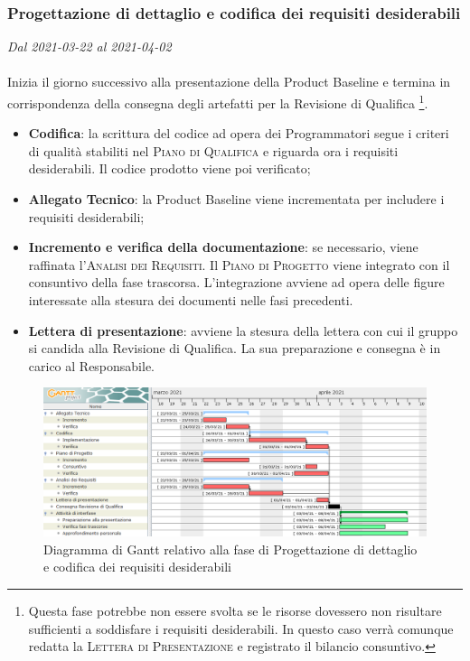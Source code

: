 \subsubsection{Progettazione di dettaglio e codifica dei requisiti desiderabili}

\textit{Dal 2021-03-22 al 2021-04-02}
\\\\
Inizia il giorno successivo alla presentazione della Product Baseline e termina in corrispondenza della consegna degli artefatti per la Revisione di Qualifica \footnote{Questa fase potrebbe non essere svolta se le risorse dovessero non risultare sufficienti a soddisfare i requisiti desiderabili. In questo caso verrà comunque redatta la \textsc{Lettera di Presentazione} e registrato il bilancio consuntivo.}.
\begin{itemize}
	\item \textbf{Codifica}: la scrittura del codice ad opera dei Programmatori segue i criteri di qualità stabiliti nel \textsc{Piano di Qualifica} e riguarda ora i requisiti desiderabili. Il codice prodotto viene poi verificato;
	\item \textbf{Allegato Tecnico}: la Product Baseline viene incrementata per includere i requisiti desiderabili;
	\item \textbf{Incremento e verifica della documentazione}: se necessario, viene raffinata l'\textsc{Analisi dei Requisiti}. Il \textsc{Piano di Progetto} viene integrato con il consuntivo della fase trascorsa. L'integrazione avviene ad opera delle figure interessate alla stesura dei documenti nelle fasi precedenti.
	\item \textbf{Lettera di presentazione}: avviene la stesura della lettera con cui il gruppo si candida alla Revisione di Qualifica. La sua preparazione e consegna è in carico al Responsabile.
	
\end{itemize}


\begin{figure}[H]
	\centering
	\includegraphics[scale=0.48]{res/images/05_gantt_codifica_desiderabili.png}
	\caption{Diagramma di Gantt relativo alla fase di Progettazione di dettaglio e codifica dei requisiti desiderabili}
\end{figure}



